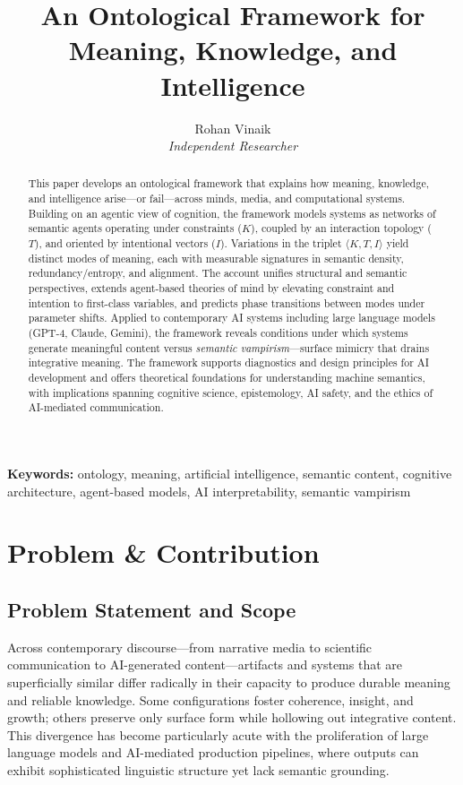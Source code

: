 \documentclass[12pt]{article}
\title{\textbf{An Ontological Framework for Meaning, Knowledge, and Intelligence}}
\author{Rohan Vinaik\\
\textit{Independent Researcher}}
\date{}
\begin{document}
\maketitle

\begin{abstract}
This paper develops an ontological framework that explains how meaning, knowledge, and intelligence arise—or fail—across minds, media, and computational systems. Building on an agentic view of cognition, the framework models systems as networks of semantic agents operating under constraints ($K$), coupled by an interaction topology ($T$), and oriented by intentional vectors ($I$). Variations in the triplet $\langle K, T, I \rangle$ yield distinct modes of meaning, each with measurable signatures in semantic density, redundancy/entropy, and alignment. The account unifies structural and semantic perspectives, extends agent-based theories of mind by elevating constraint and intention to first-class variables, and predicts phase transitions between modes under parameter shifts. Applied to contemporary AI systems including large language models (GPT-4, Claude, Gemini), the framework reveals conditions under which systems generate meaningful content versus \textit{semantic vampirism}—surface mimicry that drains integrative meaning. The framework supports diagnostics and design principles for AI development and offers theoretical foundations for understanding machine semantics, with implications spanning cognitive science, epistemology, AI safety, and the ethics of AI-mediated communication.
\end{abstract}

\noindent\textbf{Keywords:} ontology, meaning, artificial intelligence, semantic content, cognitive architecture, agent-based models, AI interpretability, semantic vampirism

\clearpage

\tableofcontents
\clearpage

\section{Problem \& Contribution}

\subsection{Problem Statement and Scope}

Across contemporary discourse—from narrative media to scientific communication to AI-generated content—artifacts and systems that are superficially similar differ radically in their capacity to produce durable meaning and reliable knowledge. Some configurations foster coherence, insight, and growth; others preserve only surface form while hollowing out integrative content. This divergence has become particularly acute with the proliferation of large language models and AI-mediated production pipelines, where outputs can exhibit sophisticated linguistic structure yet lack semantic grounding.
\end{document}
